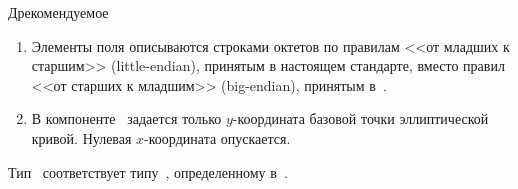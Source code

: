 \begin{appendix}{Д}{рекомендуемое}
\begin{enumerate}
\item
Элементы поля описываются строками октетов по правилам
<<от младших к старшим>> (little-endian), 
принятым в настоящем стандарте, 
вместо правил <<от старших к младшим>> (big-endian), 
принятым в~\cite{ANSI9.62}.

\item
В компоненте~ задается только $y$-координата
базовой точки эллиптической кривой. Нулевая $x$-координата опускается.
\end{enumerate}

Тип~ соответствует типу~, 
определенному в~\cite{ANSI9.62}.



\label{ASN.Module}



\end{appendix}
